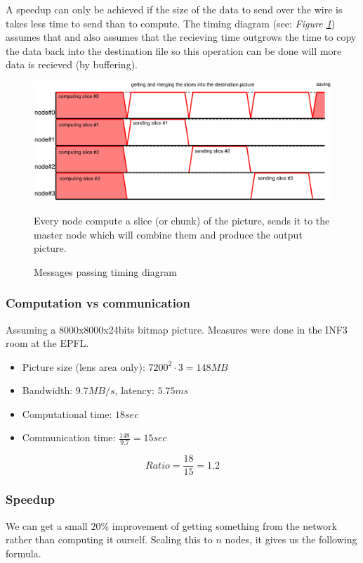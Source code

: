 \documentclass[10pt,a4paper]{article}
\begin{document}
A speedup can only be achieved if the size of the data to send over the wire is
takes less time to send than to compute. The timing diagram (see: \emph{Figure
\ref{fig:mpi}}) assumes that and also assumes that the recieving time outgrows
the time to copy the data back into the destination file so this operation can
be done will more data is recieved (by buffering).

\begin{figure}[h]
    \centering
    \includegraphics[width=0.9\linewidth]{../figures/mpi.eps}
    \caption{Messages passing timing diagram}{\small Every node compute a slice
    (or chunk) of the picture, sends it to the master node which will combine
    them and produce the output picture.}
    \label{fig:mpi}
\end{figure}

\subsubsection{Computation vs communication}
Assuming a 8000x8000x24bits bitmap picture. Measures were done in the INF3 room
at the EPFL.

\begin{itemize}
    \item Picture size (lens area only): $7200^2 \cdot 3 = 148 MB$
    \item Bandwidth: $9.7 MB/s$, latency: $5.75 ms$
    \item Computational time: $18 sec$
    \item Communication time: $\frac{148}{9.7} = 15 sec$
\end{itemize}

$$Ratio = \frac{18}{15} = 1.2$$

\subsubsection{Speedup}

We can get a small $20\%$ improvement of getting something from the network
rather than computing it ourself. Scaling this to $n$ nodes, it gives us the
following formula.
\end{document}

